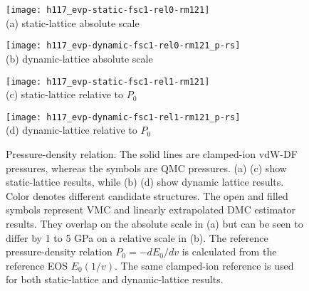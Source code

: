\begin{figure}[h]
	\centering
	\begin{minipage}{0.49\textwidth}
		\centering
		\texttt{[image: h117\_evp-static-fsc1-rel0-rm121]}\\
		(a) static-lattice absolute scale
	\end{minipage}
	\begin{minipage}{0.49\textwidth}
		\centering
		\texttt{[image: h117\_evp-dynamic-fsc1-rel0-rm121\_p-rs]}\\
		(b) dynamic-lattice absolute scale
	\end{minipage}
	\begin{minipage}{0.49\textwidth}
		\centering
		\texttt{[image: h117\_evp-static-fsc1-rel1-rm121]}\\
		(c) static-lattice relative to $P_0$
	\end{minipage}
	\begin{minipage}{0.49\textwidth}
		\centering
		\texttt{[image: h117\_evp-dynamic-fsc1-rel1-rm121\_p-rs]}\\
		(d) dynamic-lattice relative to $P_0$
	\end{minipage}
	\caption{Pressure-density relation. The solid lines are clamped-ion vdW-DF pressures, whereas the symbols are QMC pressures. (a) (c) show static-lattice results, while (b) (d) show dynamic lattice results. Color denotes different candidate structures. The open and filled symbols represent VMC and linearly extrapolated DMC estimator results. They overlap on the absolute scale in (a) but can be seen to differ by 1 to 5 GPa on a relative scale in (b). The reference pressure-density relation $P_0=-dE_0/dv$ is calculated from the reference EOS $E_0(1/v)$. The same clamped-ion reference is used for both static-lattice and dynamic-lattice results.}
	\label{fig:hsolid-p-vs-n}
\end{figure}

